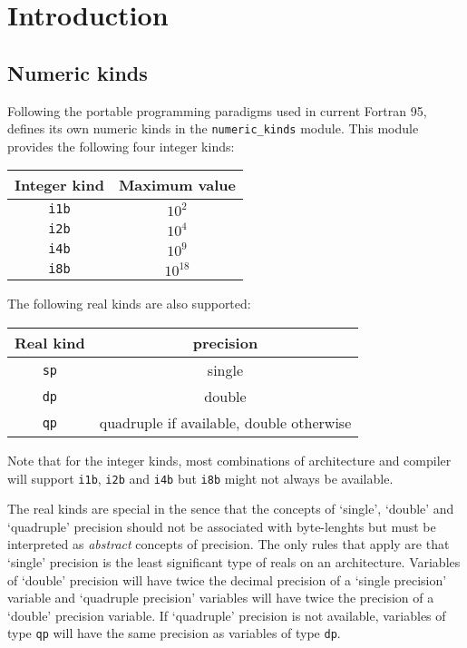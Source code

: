 \chapter{Introduction}

\section{Numeric kinds}

Following the portable programming paradigms used in current Fortran 95,
\qmcpack{} defines its own numeric kinds in the \verb!numeric_kinds! module.
This module provides the following four integer kinds:
\begin{center}
\begin{tabular}{cc}
Integer kind & Maximum value \\ \hline
\verb!i1b! & $10^2$ \\
\verb!i2b! & $10^4$ \\
\verb!i4b! & $10^9$ \\
\verb!i8b! & $10^{18}$ \\ \hline
\end{tabular}
\end{center}
%
The following real kinds are also supported:
%
\begin{center}
\begin{tabular}{cc}
Real kind & precision \\ \hline
\verb!sp! & single    \\
\verb!dp! & double    \\
\verb!qp! & quadruple if available, double otherwise \\ \hline
\end{tabular}
\end{center}
%
Note that for the integer kinds, most combinations of architecture and compiler
will support \verb!i1b!, \verb!i2b! and \verb!i4b! but \verb!i8b!
might not always be available.

The real kinds are special in the sence that the concepts of `single', `double'
and `quadruple' precision should not be associated with byte-lenghts but must 
be interpreted as \emph{abstract} concepts of precision.  The only rules that
apply are that `single' precision is the least significant type of reals on an
architecture.  Variables of `double' precision will have twice the decimal
precision of a `single precision' variable and `quadruple precision'
variables will have twice the precision of a `double' precision variable.
If `quadruple' precision is not available, variables of type \verb!qp! will
have the same precision as variables of type \verb!dp!.

